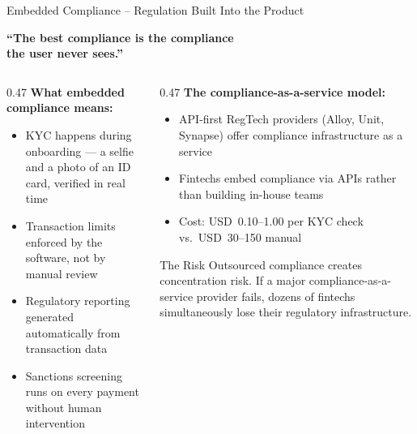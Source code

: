 \begin{frame}{Embedded Compliance -- Regulation Built Into the Product}
  \begin{center}
    \Large
    \textcolor{mlteal}{\textbf{``The best compliance is the compliance\\
    the user never sees.''}}
  \end{center}
  \vspace{0.5em}
  \begin{columns}[T]
    \begin{column}{0.47\textwidth}
      \textcolor{mlpurple}{\textbf{What embedded compliance means:}}
      \begin{itemize}
        \item KYC happens during onboarding --- a selfie and a photo of
              an ID card, verified in real time
        \item Transaction limits enforced by the software, not by manual
              review
        \item Regulatory reporting generated automatically from
              transaction data
        \item Sanctions screening runs on every payment without human
              intervention
      \end{itemize}
    \end{column}
    \begin{column}{0.47\textwidth}
      \textcolor{mlblue}{\textbf{The compliance-as-a-service model:}}
      \begin{itemize}
        \item API-first RegTech providers (Alloy, Unit, Synapse) offer
              compliance infrastructure as a service
        \item Fintechs embed compliance via APIs rather than building
              in-house teams
        \item Cost: USD~0.10--1.00 per KYC check vs.\ USD~30--150 manual
      \end{itemize}
      \vspace{0.3em}
      \begin{alertblock}{The Risk}
        Outsourced compliance creates \textcolor{mlred}{concentration risk}.
        If a major compliance-as-a-service provider fails, dozens of
        fintechs simultaneously lose their regulatory infrastructure.
      \end{alertblock}
    \end{column}
  \end{columns}
\end{frame}

